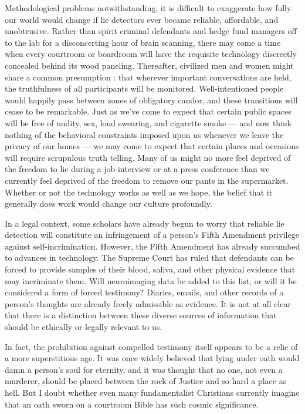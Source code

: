 \documentclass[a4paper,14pt]{extbook}
\begin{document}
Methodological problems notwithstanding, it is difficult to exaggerate how fully our world would change if lie detectors ever became reliable, affordable, and unobtrusive.
Rather than spirit criminal defendants and hedge fund managers off to the lab for a disconcerting hour of brain scanning, there may come a time when every courtroom or boardroom will have the requisite technology discreetly concealed behind its wood paneling.
Thereafter, civilized men and women might share a common presumption :
that wherever important conversations are held, the truthfulness of all participants will be monitored.
Well-intentioned people would happily pass between zones of obligatory candor, and these transitions will cease to be remarkable.
Just as we’ve come to expect that certain public spaces will be free of nudity, sex, loud swearing, and cigarette smoke --- and now think nothing of the behavioral constraints imposed upon us whenever we leave the privacy of our homes --- we may come to expect that certain places and occasions will require scrupulous truth telling.
Many of us might no more feel deprived of the freedom to lie during a job interview or at a press conference than we currently feel deprived of the freedom to remove our pants in the supermarket.
Whether or not the technology works as well as we hope, the belief that it generally does work would change our culture profoundly.

In a legal context, some scholars have already begun to worry that reliable lie detection will constitute an infringement of a person’s Fifth Amendment privilege against self-incrimination.
However, the Fifth Amendment has already succumbed to advances in technology.
The Supreme Court has ruled that defendants can be forced to provide samples of their blood, saliva, and other physical evidence that may incriminate them.
Will neuroimaging data be added to this list, or will it be considered a form of forced testimony?
Diaries, emails, and other records of a person’s thoughts are already freely admissible as evidence.
It is not at all clear that there is a distinction between these diverse sources of information that should be ethically or legally relevant to us.

In fact, the prohibition against compelled testimony itself appears to be a relic of a more superstitious age.
It was once widely believed that lying under oath would damn a person’s soul for eternity, and it was thought that no one, not even a murderer, should be placed between the rock of Justice and so hard a place as hell.
But I doubt whether even many fundamentalist Christians currently imagine that an oath sworn on a courtroom Bible has such cosmic significance.
\end{document}
